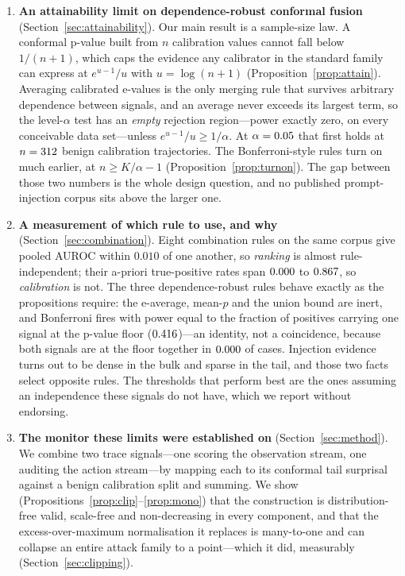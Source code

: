 \documentclass[preprint,12pt,authoryear]{elsarticle}
\theoremstyle{definition}
\begin{document}
\begin{enumerate}
\item \textbf{An attainability limit on dependence-robust conformal fusion}
(Section~\ref{sec:attainability}). Our main result is a sample-size law.
A conformal p-value built from $n$ calibration values cannot fall below
$1/(n{+}1)$, which caps the evidence any calibrator in the standard family can
express at $e^{u-1}/u$ with $u = \log(n{+}1)$
(Proposition~\ref{prop:attain}). Averaging calibrated e-values is the only merging
rule that survives arbitrary dependence between signals, and an average never
exceeds its largest term, so the level-$\alpha$ test has an \emph{empty} rejection
region---power exactly zero, on every conceivable data set---unless
$e^{u-1}/u \ge 1/\alpha$. At $\alpha = 0.05$ that first holds at
$n = 312$ benign calibration trajectories. The Bonferroni-style rules turn on
much earlier, at $n \ge K/\alpha - 1$ (Proposition~\ref{prop:turnon}). The gap
between those two numbers is the whole design question, and no published
prompt-injection corpus sits above the larger one.

\item \textbf{A measurement of which rule to use, and why}
(Section~\ref{sec:combination}). Eight combination rules on the same corpus give
pooled AUROC within $0.010$ of one another, so \emph{ranking} is almost
rule-independent; their a-priori true-positive rates span
$0.000$ to $0.867$, so \emph{calibration} is not. The three
dependence-robust rules behave exactly as the propositions require: the e-average,
mean-$p$ and the union bound are inert, and Bonferroni fires with power equal to
the fraction of positives carrying one signal at the p-value floor
($0.416$)---an identity, not a coincidence, because both signals are at the
floor together in $0.000$ of cases. Injection evidence turns out to be dense
in the bulk and sparse in the tail, and those two facts select opposite rules. The
thresholds that perform best are the ones assuming an independence these signals
do not have, which we report without endorsing.

\item \textbf{The monitor these limits were established on}
(Section~\ref{sec:method}). We combine two trace signals---one scoring the
observation stream, one auditing the action stream---by mapping each to its
conformal tail surprisal against a benign calibration split and summing. We show
(Propositions~\ref{prop:clip}--\ref{prop:mono}) that the construction is
distribution-free valid, scale-free and non-decreasing in every component, and
that the excess-over-maximum normalisation it replaces is many-to-one and can
collapse an entire attack family to a point---which it did, measurably
(Section~\ref{sec:clipping}).


\end{enumerate}
\end{document}
